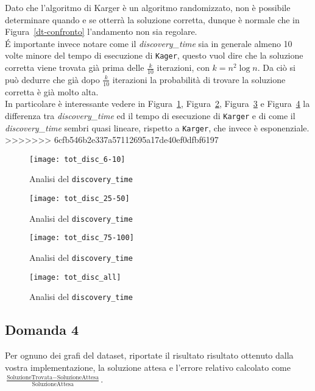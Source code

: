 Dato che l'algoritmo di Karger è un algoritmo randomizzato, non è possibile determinare quando e se otterrà la soluzione corretta, dunque è normale che in Figura~\ref{dt-confronto} l'andamento non sia regolare.\\
\'E importante invece notare come il \textit{discovery\_time} sia in generale almeno 10 volte minore del tempo di esecuzione di \texttt{Kager}, questo vuol dire che la soluzione corretta viene trovata già prima delle $\frac{k}{10}$ iterazioni, con $k = n^2 \log n$. Da ciò si può dedurre che già dopo $\frac{k}{10}$ iterazioni la probabilità di trovare la soluzione corretta è già molto alta.\\

In particolare è interessante vedere in Figura~\ref{dt-confronto1}, Figura~\ref{dt-confronto2}, Figura~\ref{dt-confronto3} e Figura~\ref{dt-confronto4} la differenza tra \textit{discovery\_time} ed il tempo di esecuzione di \texttt{Karger} e di come il \textit{discovery\_time} sembri quasi lineare, rispetto a \texttt{Karger}, che invece è esponenziale.
>>>>>>> 6cfb546b2e337a57112695a17de40ef0dfbf6197

\begin{figure}[H]
	\centering
	\texttt{[image: tot\_disc\_6-10]}
	\caption{Analisi del \texttt{discovery\_time}}
	\label{dt-confronto1}
\end{figure}

\begin{figure}[H]
	\centering
	\texttt{[image: tot\_disc\_25-50]}
	\caption{Analisi del \texttt{discovery\_time}}
	\label{dt-confronto2}
\end{figure}

\begin{figure}[H]
	\centering
	\texttt{[image: tot\_disc\_75-100]}
	\caption{Analisi del \texttt{discovery\_time}}
	\label{dt-confronto3}
\end{figure}

\begin{figure}[H]
	\centering
	\texttt{[image: tot\_disc\_all]}
	\caption{Analisi del \texttt{discovery\_time}}
	\label{dt-confronto4}
\end{figure}

\subsection{Domanda 4}
Per ognuno dei grafi del dataset, riportate il risultato risultato ottenuto dalla vostra implementazione, la soluzione attesa e l'errore relativo calcolato come $ \frac{\textrm{SoluzioneTrovata}-\textrm{SoluzioneAttesa}}{\textrm{SoluzioneAttesa}}$.


